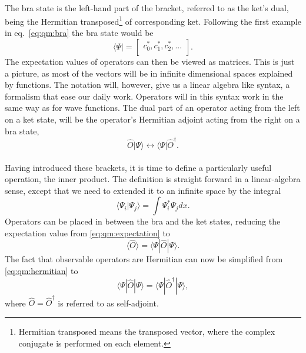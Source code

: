 \paragraph*{}
The bra state is the left-hand part of the bracket, referred to as the ket's dual, being the Hermitian transposed\footnote{Hermitian transposed means the transposed vector, where the complex conjugate is performed on each element.} of corresponding ket.
Following the first example in eq.~\eqref{eq:qm:bra} the bra state would be
\begin{equation}
\langle \Psi | =
\begin{bmatrix}
c_0^{*}, c_1^{*}, c_2^{*}, ... \\
\end{bmatrix}.
\end{equation}
The expectation values of operators can then be viewed as matrices.
This is just a picture, as 
most of the vectors will be in infinite dimensional spaces explained by
functions.
The notation will, however, give us a linear algebra like syntax, a formalism
that ease our daily work.
Operators will in this syntax work in the same way as for wave functions.
The dual part of an operator acting from the left on a ket state, will be the operator's Hermitian adjoint acting from the right on a bra state,
\begin{equation}
\hat{O}|\Psi \rangle  \longleftrightarrow  \langle \Psi | \hat{O}^{\dagger} .
\end{equation}

\paragraph*{}
Having introduced these brackets, it is time to define a particularly useful
operation, the inner product.
The definition is straight forward in a linear-algebra sense, except that we need to  extended it to an infinite space by the integral 
\begin{equation}
\langle \Psi_i | \Psi_j \rangle =
\int \Psi_i^{*} \Psi_j dx .
\end{equation}
Operators can be placed in between the bra and the ket states, reducing the expectation value
from \eqref{eq:qm:expectation} to
\begin{equation}
\langle \hat{O} \rangle = 
\langle \Psi | \hat{O} | \Psi \rangle .
\end{equation}
The fact that observable operators are Hermitian can now be simplified from
\eqref{eq:qm:hermitian} to 
\begin{equation}
\langle \Psi | \hat{O} | \Psi \rangle = \langle \Psi | \hat{O}^{\dagger} | \Psi \rangle,
\end{equation}
where $\hat{O} = \hat{O}^{\dagger}$ is referred to as self-adjoint.



